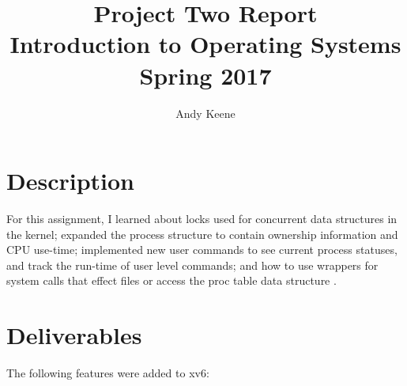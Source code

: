 \documentclass[11pt,letterpaper]{report}
\author{Andy Keene}
\title{Project Two Report\\Introduction to Operating Systems\\ Spring 2017}
\date{}
\begin{document}
	\maketitle
	

	\section*{Description}
	For this assignment, I learned about locks used for concurrent data structures in the kernel; expanded the process structure to contain ownership information and CPU use-time; implemented new user commands to see current process statuses, and track the run-time of user level commands; and how to use wrappers for system calls that effect files or access the proc table data structure . \\
		
	\section*{Deliverables}
	The following features were added to xv6:
	
\end{document}
